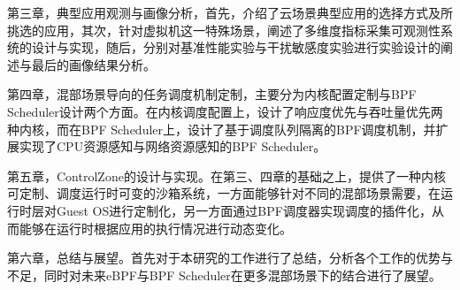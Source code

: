 第三章，典型应用观测与画像分析，首先，介绍了云场景典型应用的选择方式及所挑选的应用，其次，针对虚拟机这一特殊场景，阐述了多维度指标采集可观测性系统的设计与实现，随后，分别对基准性能实验与干扰敏感度实验进行实验设计的阐述与最后的画像结果分析。

第四章，混部场景导向的任务调度机制定制，主要分为内核配置定制与BPF Scheduler设计两个方面。在内核调度配置上，设计了响应度优先与吞吐量优先两种内核，而在BPF Scheduler上，设计了基于调度队列隔离的BPF调度机制，并扩展实现了CPU资源感知与网络资源感知的BPF Scheduler。

第五章，ControlZone的设计与实现。在第三、四章的基础之上，提供了一种内核可定制、调度运行时可变的沙箱系统，一方面能够针对不同的混部场景需要，在运行时层对Guest OS进行定制化，另一方面通过BPF调度器实现调度的插件化，从而能够在运行时根据应用的执行情况进行动态变化。

第六章，总结与展望。首先对于本研究的工作进行了总结，分析各个工作的优势与不足，同时对未来eBPF与BPF Scheduler在更多混部场景下的结合进行了展望。